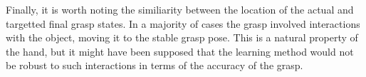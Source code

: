 Finally, it is worth noting the similiarity between the location of the actual and targetted final grasp states. In a majority of cases the grasp involved interactions with the object, moving it to the stable grasp pose. This is a natural property of the hand, but it might have been supposed that the learning method would not be robust to such interactions in terms of the accuracy of the grasp. 
